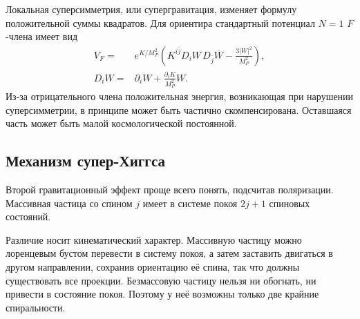 Локальная суперсимметрия, или супергравитация, изменяет формулу положительной суммы квадратов. Для ориентира стандартный потенциал \(N=1\) \(F\)-члена имеет вид
\begin{equation}
\begin{aligned}
V_F={}&e^{K/M_P^2}
\left(
K^{i\bar j}D_iW\,D_{\bar j}\overline W
-\frac{3|W|^2}{M_P^2}
\right),\\
D_iW={}&\partial_iW+\frac{\partial_iK}{M_P^2}W.
\end{aligned}
\label{eq:l9-sugra-potential}
\end{equation}
Из-за отрицательного члена положительная энергия, возникающая при нарушении суперсимметрии, в принципе может быть частично скомпенсирована. Оставшаяся часть может быть малой космологической постоянной.


\subsection{Механизм супер-Хиггса}

Второй гравитационный эффект проще всего понять, подсчитав поляризации. Массивная частица со спином \(j\) имеет в системе покоя \(2j+1\) спиновых состояний.

\begin{classroomqa}
\end{classroomqa}

Различие носит кинематический характер. Массивную частицу можно лоренцевым бустом перевести в систему покоя, а затем заставить двигаться в другом направлении, сохранив ориентацию её спина, так что должны существовать все проекции. Безмассовую частицу нельзя ни обогнать, ни привести в состояние покоя. Поэтому у неё возможны только две крайние спиральности.

